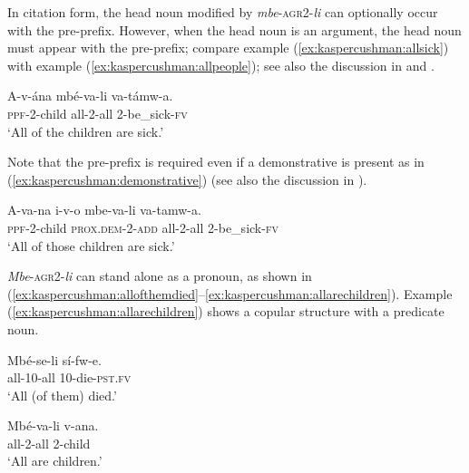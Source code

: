 \documentclass[output=paper,modfonts,nonflat]{langsci/langscibook}
\begin{document}
In citation form, the head noun modified by \textit{mbe}-\textsc{agr2}-\textit{li} can optionally occur with the pre-prefix.  However, when the head noun is an argument, the head noun must appear with the pre-prefix; compare example (\ref{ex:kaspercushman:allsick}) with example (\ref{ex:kaspercushman:allpeople}); see also the discussion in  and \cite{gambarage16}. 
 
\begin{exe}
\ex 
\gll A-v-ána mbé-va-li va-támw-a. \\
\textsc{ppf}-2-child all-2-all 2-be\_sick-\textsc{fv} \\
\glt `All of the children are sick.' \\ \label{ex:kaspercushman:allsick}
\end{exe}

Note that the pre-prefix is required even if a demonstrative is present as in (\ref{ex:kaspercushman:demonstrative}) (see also the discussion in \citealt[32--33]{Matthewson2013}). 
\begin{exe}

\ex \label{ex:kaspercushman:demonstrative}
\gll A-va-na i-v-o mbe-va-li va-tamw-a. \\
\textsc{ppf}-2-child \textsc{prox.dem}-2-\textsc{add} all-2-all 2-be\_sick-\textsc{fv} \\
\glt `All of those children are sick.' \\
\end{exe}


\textit{Mbe}-\textsc{agr2}-\textit{li} can stand alone as a pronoun, as shown in (\ref{ex:kaspercushman:allofthemdied}--\ref{ex:kaspercushman:allarechildren}).  Example (\ref{ex:kaspercushman:allarechildren}) shows a copular structure with a predicate noun. 

\begin{exe}
\ex \label{ex:kaspercushman:allofthemdied} 
\gll Mbé-se-li sí-fw-e. \\ 
all-10-all 10-die-\textsc{pst}.\textsc{fv} \\
\glt `All (of them) died.' 

\end{exe}

\begin{exe}
\ex \label{ex:kaspercushman:allarechildren} 
\gll Mbé-va-li v-ana. \\
all-2-all 2-child \\
\glt `All are children.'
\end{exe}
\end{document}
